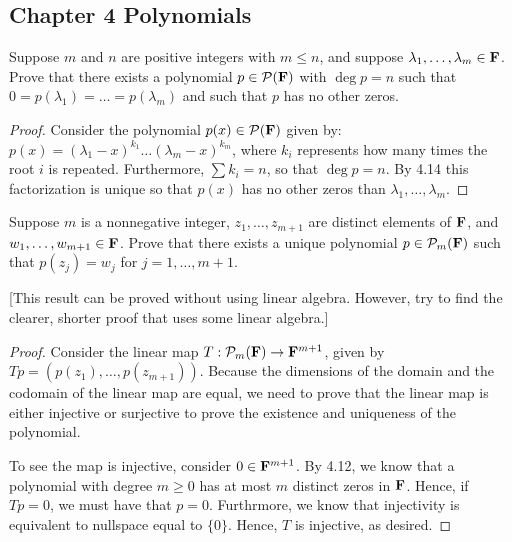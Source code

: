 \subsection*{Chapter 4 Polynomials}


\begin{exercise}{4}
  Suppose $m$ and $n$ are positive integers with $m\leq n$, and suppose $\lambda_1,\dots,\\ \lambda_m\in\mathbf{F}$. Prove that there exists a polynomial $p\in\mathcal{P}(\mathbf{F})$ with $\deg p=n$ such that $0=p(\lambda_1)=\dots=p(\lambda_m)$ and such that $p$ has no other zeros.
\end{exercise}
\begin{proof}
 Consider the polynomial $p(x)\in\mathcal{P}(\mathbf{F})$ given by: $p(x)=(\lambda_1-x)^{k_1}\dots(\lambda_m-x)^{k_m}$, where $k_i$ represents how many times the root $i$ is repeated. Furthermore, $\sum k_i=n$, so that $\deg p=n$. By 4.14 this factorization is unique so that $p(x)$ has no other zeros than $\lambda_1,\dots,\lambda_m$.
\end{proof}

\begin{exercise}{5}
  Suppose $m$ is a nonnegative integer, $z_1,\dots,z_{m+1}$ are distinct elements of $\mathbf{F}$, and $w_1,\dots,w_{m+1}\in\mathbf{F}$. Prove that there exists a unique polynomial $p\in\mathcal{P}_m(\mathbf{F})$ such that $p(z_j)=w_j$ for $j=1,\dots,m+1$.

  [This result can be proved without using linear algebra. However, try to find the clearer, shorter proof that uses some linear algebra.]
\end{exercise}
\begin{proof}
 Consider the linear map $T:\mathcal{P}_m(\mathbf{F})\rightarrow \mathbf{F}^{m+1}$, given by \\$Tp=(p(z_1),\dots,p(z_{m+1}))$. Because the dimensions of the domain and the codomain of the linear map are equal, we need to prove that the linear map is either injective or surjective to prove the existence and uniqueness of the polynomial.

 To see the map is injective, consider $0\in\mathbf{F}^{m+1}$. By 4.12, we know that a polynomial with degree $m\geq 0$ has at most $m$ distinct zeros in $\mathbf{F}$. Hence, if $Tp=0$, we must have that $p=0$. Furthrmore, we know that injectivity is equivalent to nullspace equal to $\{0\}$. Hence, $T$ is injective, as desired.
\end{proof}


